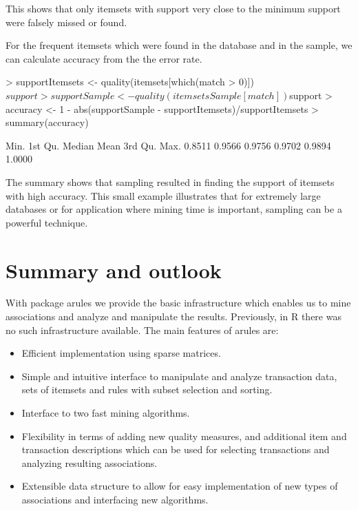 \documentclass[10pt,a4paper]{article}
\newcommand{\strong}[1]{{\normalfont\fontseries{b}\selectfont #1}}
\newcommand{\pkg}[1]{\strong{#1}}
\newcommand{\proglang}[1]{\textsf{#1}}
\begin{document}
This shows that only itemsets with support very close to the minimum support
were falsely missed or found.

For the frequent itemsets which were found in the database and in the
sample, we can calculate accuracy from the the error rate.

\begin{Schunk}
\begin{Sinput}
> supportItemsets <- quality(itemsets[which(match > 0)])$support
> supportSample <- quality(itemsetsSample[match])$support
> accuracy <- 1 - abs(supportSample - supportItemsets)/supportItemsets
> summary(accuracy)
\end{Sinput}
\begin{Soutput}
   Min. 1st Qu.  Median    Mean 3rd Qu.    Max. 
 0.8511  0.9566  0.9756  0.9702  0.9894  1.0000 
\end{Soutput}
\end{Schunk}

The summary shows that sampling resulted in finding the support of itemsets
with high accuracy. This small example illustrates 
that for extremely large databases or for application where mining time 
is important, sampling can be a powerful technique.



\section{Summary and outlook\label{sec:conclusion}}

With package \pkg{arules} we
provide the basic infrastructure which enables us to 
mine associations and analyze and manipulate the results. 
Previously, in \proglang{R} there was no such infrastructure available.
The main features of \pkg{arules} are:

\begin{itemize}
 \item Efficient implementation using sparse matrices.
 \item Simple and intuitive interface to manipulate and analyze
  transaction data, sets of itemsets and rules with subset selection and
  sorting.
 \item Interface to two fast mining algorithms.
 \item Flexibility in terms of adding new quality measures, and
  additional item and transaction descriptions which can be used for
  selecting transactions and analyzing resulting associations.
 \item Extensible data structure to allow for easy implementation of new
  types of associations and interfacing new algorithms.
\end{itemize}
\end{document}
